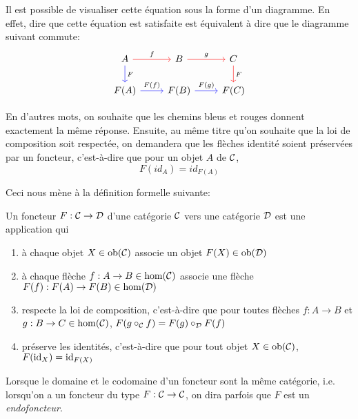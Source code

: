 Il est possible de visualiser cette équation sous la forme d'un diagramme.
En effet, dire que cette équation est satisfaite est équivalent à dire que
le diagramme suivant commute:
\[
\begin{tikzcd}
    A \arrow[r, red, "f" black] \arrow[d, blue, "F" black] & B \arrow[r, red, "g" black] & C \arrow[d, red, "F" black] \\
    F(A) \arrow[r, blue, "F(f)" black] & F(B) \arrow[r, blue, "F(g)" black] & F(C)
\end{tikzcd}
\]

En d'autres mots, on souhaite que les chemins bleus et rouges donnent
exactement la même réponse. Ensuite, au même titre qu'on souhaite que la loi
de composition soit respectée, on demandera que les flèches identité soient
préservées par un foncteur, c'est-à-dire que pour un objet $A$ de $\mathcal{C}$,
\[
    F(id_A) = id_{F(A)}
\]

Ceci nous mène à la définition formelle suivante:

\begin{définition}[Foncteur]
    Un foncteur $F : \mathcal{C} \to \mathcal{D}$ d'une catégorie $\mathcal{C}$ vers une catégorie $\mathcal{D}$
    est une application qui
    \begin{enumerate}
        \item à chaque objet $X \in \mathrm{ob}(\mathcal{C})$ associe un objet $F(X) \in \mathrm{ob}(\mathcal{D})$
        \item à chaque flèche $f : A \to B \in \hom(\mathcal{C})$ associe une flèche
              $F(f) : F(A) \to F(B) \in \hom(\mathcal{D})$
        \item respecte la loi de composition, c'est-à-dire que pour toutes
              flèches $f : A \to B$ et $g : B \to C \in \hom(\mathcal{C})$,
              $F(g \circ_{\mathcal{C}} f) = F(g) \circ_{\mathcal{D}} F(f)$
        \item préserve les identités, c'est-à-dire que pour tout objet
              $X \in \mathrm{ob}(\mathcal{C})$, $F(\mathrm{id}_X) = \mathrm{id}_{F(X)}$
    \end{enumerate}
\end{définition}

Lorsque le domaine et le codomaine d'un foncteur sont la même catégorie, i.e.
lorsqu'on a un foncteur du type $F : \mathcal{C} \to \mathcal{C}$, on dira parfois que $F$ est
un \textit{endofoncteur}.



